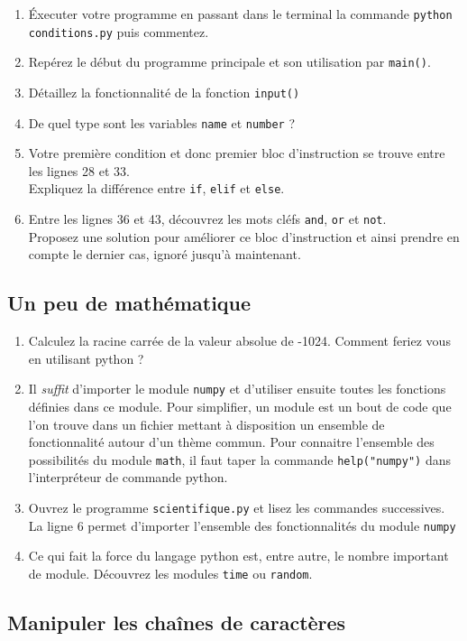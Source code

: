 \begin{enumerate}
\item Éxecuter votre programme en passant dans le terminal la commande \texttt{python conditions.py} puis commentez.

\item Repérez le début du programme principale et son utilisation par \texttt{main()}.

\item Détaillez la fonctionnalité de la fonction \texttt{input()}

\item De quel type sont les variables \texttt{name} et \texttt{number} ?

\item Votre première condition et donc premier bloc d'instruction se trouve entre les lignes 28 et 33.\\
  Expliquez la différence entre \texttt{if}, \texttt{elif} et \texttt{else}.

\item Entre les lignes 36 et 43, découvrez les mots cléfs \texttt{and}, \texttt{or} et \texttt{not}.\\
  Proposez une solution pour améliorer ce bloc d'instruction et ainsi prendre en
  compte le dernier cas, ignoré jusqu'à maintenant.


\end{enumerate}

\subsection{Un peu de mathématique}

\begin{enumerate}
\item Calculez la racine carrée de la valeur absolue de -1024.
  Comment feriez vous en utilisant python ?

\item Il \textit{suffit} d'importer le module \texttt{numpy} et d'utiliser ensuite
  toutes les fonctions définies dans ce module.
  Pour simplifier, un module est un bout de code que l'on trouve dans un fichier
  mettant à disposition un ensemble de fonctionnalité autour d'un thème commun.
  Pour connaitre l'ensemble des possibilités du module \texttt{math}, il faut taper la commande
  \texttt{help("numpy")} dans l'interpréteur de commande python.


\item Ouvrez le programme \texttt{scientifique.py} et lisez les commandes successives.
  La ligne 6 permet d'importer l'ensemble des fonctionnalités du module \texttt{numpy}

\item Ce qui fait la force du langage python est, entre autre, le nombre important de module.
  Découvrez les modules \texttt{time} ou \texttt{random}.


\end{enumerate}




\subsection{Manipuler les chaînes de caractères}
